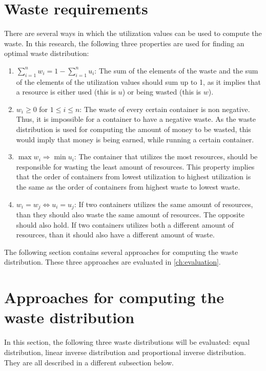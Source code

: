 \section{Waste requirements} \label{sec:waste_requirements}
There are several ways in which the utilization values can be used to compute the waste. In this research, the following three properties are used for finding an optimal waste distribution:
\begin{enumerate}
    \item \textbf{$\sum_{i=1}^n w_i = 1 - \sum_{i=1}^n u_i $}: The sum of the elements of the waste and the sum of the elements of the utilization values should sum up to 1, as it implies that a resource is either used (this is $u$) or being wasted (this is $w$).
    \item \textbf{$w_i \geq 0$} for $1 \leq i \leq n$: The waste of every certain container is non negative. Thus, it is impossible for a container to have a negative waste. As the waste distribution is used for computing the amount of money to be wasted, this would imply that money is being earned, while running a certain container.
    \item \textbf{$\max w_i \Rightarrow \min u_i$}: The container that utilizes the most resources, should be responsible for wasting the least amount of resources. This property implies that the order of containers from lowest utilization to highest utilization is the same as the order of containers from highest waste to lowest waste. 
    \item \textbf{$w_i = w_j \iff u_i = u_j$}: If two containers utilizes the same amount of resources, than they should also waste the same amount of resources. The opposite should also hold. If two containers utilizes both a different amount of resources, than it should also have a different amount of waste.
\end{enumerate}

\noindent
The following section contains several approaches for computing the waste distribution. These three approaches are evaluated in \autoref{ch:evaluation}.

\section{Approaches for computing the waste distribution} \label{sec:approaches}
In this section, the following three waste distributions will be evaluated: equal distribution, linear inverse distribution and proportional inverse distribution. They are all described in a different subsection below.


